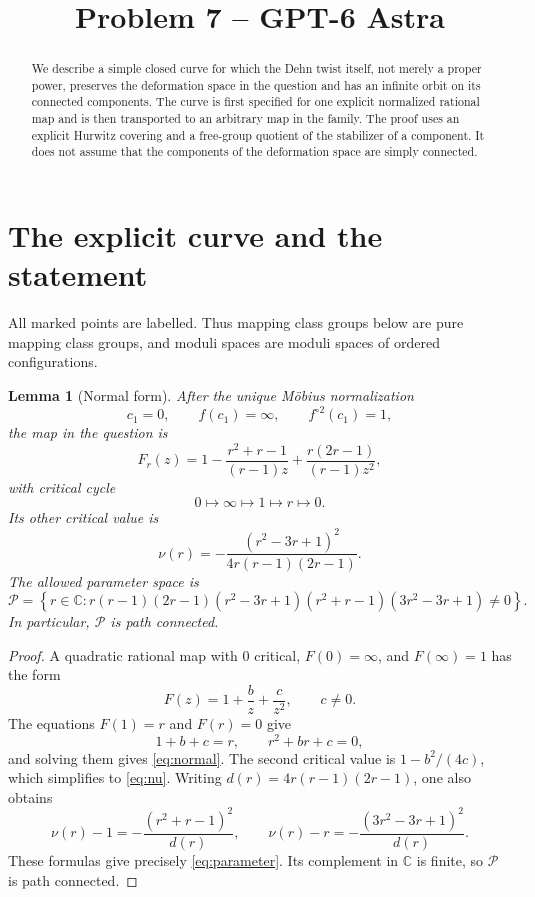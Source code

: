 \documentclass[11pt]{article}
\title{Problem 7 -- GPT-6 Astra}
\author{}
\date{}
\newcommand{\C}{\mathbb C}
\newcommand{\Par}{\mathcal P}
\newtheorem{lemma}[theorem]{Lemma}
\theoremstyle{definition}
\theoremstyle{remark}
\begin{document}
\maketitle

\begin{abstract}
We describe a simple closed curve for which the Dehn twist itself,
not merely a proper power, preserves the deformation space in the
question and has an infinite orbit on its connected components.
The curve is first specified for one explicit normalized rational map
and is then transported to an arbitrary map in the family.
The proof uses an explicit Hurwitz covering and a free-group quotient
of the stabilizer of a component.  It does not assume that the
components of the deformation space are simply connected.
\end{abstract}

\section{The explicit curve and the statement}

All marked points are labelled.  Thus mapping class groups below are
pure mapping class groups, and moduli spaces are moduli spaces of
ordered configurations.

\begin{lemma}[Normal form]\label{lem:normal}
After the unique M\"obius normalization
\[
c_1=0,\qquad f(c_1)=\infty,\qquad f^{\circ 2}(c_1)=1,
\]
the map in the question is
\begin{equation}\label{eq:normal}
F_r(z)=
1-\frac{r^2+r-1}{(r-1)z}
+\frac{r(2r-1)}{(r-1)z^2},
\end{equation}
with critical cycle
\[
0\longmapsto\infty\longmapsto1\longmapsto r\longmapsto0.
\]
Its other critical value is
\begin{equation}\label{eq:nu}
\nu(r)=
-\frac{(r^2-3r+1)^2}{4r(r-1)(2r-1)}.
\end{equation}
The allowed parameter space is
\begin{equation}\label{eq:parameter}
\Par=
\left\{
r\in\C:
r(r-1)(2r-1)
(r^2-3r+1)(r^2+r-1)(3r^2-3r+1)\ne0
\right\}.
\end{equation}
In particular, $\Par$ is path connected.
\end{lemma}

\begin{proof}
A quadratic rational map with $0$ critical, $F(0)=\infty$, and
$F(\infty)=1$ has the form
\[
F(z)=1+\frac b z+\frac c{z^2},\qquad c\ne0.
\]
The equations $F(1)=r$ and $F(r)=0$ give
\[
1+b+c=r,\qquad r^2+br+c=0,
\]
and solving them gives \eqref{eq:normal}.  The second critical value is
$1-b^2/(4c)$, which simplifies to \eqref{eq:nu}.
Writing $d(r)=4r(r-1)(2r-1)$, one also obtains
\[
\nu(r)-1=-\frac{(r^2+r-1)^2}{d(r)},\qquad
\nu(r)-r=-\frac{(3r^2-3r+1)^2}{d(r)}.
\]
These formulas give precisely \eqref{eq:parameter}.  Its complement
in $\C$ is finite, so $\Par$ is path connected.
\end{proof}
\end{document}
